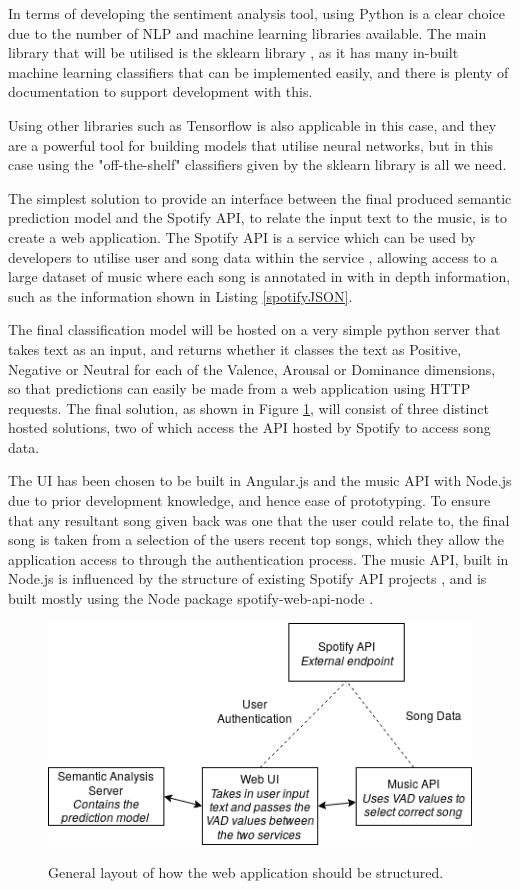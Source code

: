 In terms of developing the sentiment analysis tool, using Python is a clear choice due to the number of NLP and machine learning libraries available. The main library that will be utilised is the sklearn library \cite{sklearn}, as it has many in-built machine learning classifiers that can be implemented easily, and there is plenty of documentation to support development with this. 

Using other libraries such as Tensorflow is also applicable in this case,  and they are a powerful tool for building models that utilise neural networks, but in this case using the "off-the-shelf" classifiers given by the sklearn library is all we need.

The simplest solution to provide an interface between the final produced semantic prediction model and the Spotify API, to relate the input text to the music, is to create a web application. The Spotify API is a service which can be used by developers to utilise user and song data within the service \cite{nodeSpotify}, allowing access to a large dataset of music where each song is annotated in with in depth information, such as the information shown in Listing \ref{spotifyJSON}.

The final classification model will be hosted on a very simple python server that takes text as an input, and returns whether it classes the text as Positive, Negative or Neutral for each of the Valence, Arousal or Dominance dimensions, so that predictions can easily be made from a web application using HTTP requests. The final solution, as shown in Figure \ref{implementationLayout}, will consist of three distinct hosted solutions, two of which access the API hosted by Spotify to access song data.

The UI has been chosen to be built in Angular.js and the music API with Node.js due to prior development knowledge, and hence ease of prototyping. 
To ensure that any resultant song given back was one that the user could relate to, the final song is taken from a selection of the users recent top songs, which they allow the application access to through the authentication process.
The music API, built in Node.js is influenced by the structure of existing Spotify API projects \cite{moodtape}, and is built mostly using the Node package spotify-web-api-node \cite{nodeSpotify}.

\begin{figure}[ht]
\caption{General layout of how the web application should be structured.}
\centering
\includegraphics[scale=0.6]{litImgs/interfaceLayout.png}
\label{implementationLayout}
\end{figure}

